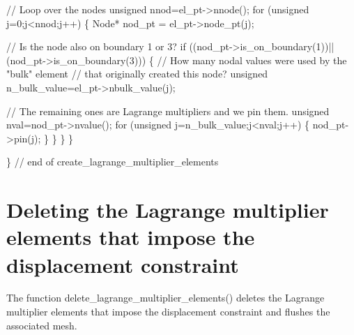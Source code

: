 \begin{DoxyCodeInclude}
   
   \textcolor{comment}{// Loop over the nodes }
   \textcolor{keywordtype}{unsigned} nnod=el\_pt->nnode();
   \textcolor{keywordflow}{for} (\textcolor{keywordtype}{unsigned} j=0;j<nnod;j++)
    \{
     Node* nod\_pt = el\_pt->node\_pt(j);
     
     \textcolor{comment}{// Is the node also on boundary 1 or 3?}
     \textcolor{keywordflow}{if} ((nod\_pt->is\_on\_boundary(1))||(nod\_pt->is\_on\_boundary(3)))
      \{
       \textcolor{comment}{// How many nodal values were used by the "bulk" element}
       \textcolor{comment}{// that originally created this node?}
       \textcolor{keywordtype}{unsigned} n\_bulk\_value=el\_pt->nbulk\_value(j);
       
       \textcolor{comment}{// The remaining ones are Lagrange multipliers and we pin them.}
       \textcolor{keywordtype}{unsigned} nval=nod\_pt->nvalue();
       \textcolor{keywordflow}{for} (\textcolor{keywordtype}{unsigned} j=n\_bulk\_value;j<nval;j++)
        \{
         nod\_pt->pin(j);
        \}
      \}
    \}
  \}
  
\} \textcolor{comment}{// end of create\_lagrange\_multiplier\_elements}

\end{DoxyCodeInclude}




 

\hypertarget{index_kill_lagr_elements}{}\section{Deleting the Lagrange multiplier elements that impose the displacement constraint}\label{index_kill_lagr_elements}
The function {\ttfamily delete\+\_\+lagrange\+\_\+multiplier\+\_\+elements()} deletes the Lagrange multiplier elements that impose the displacement constraint and flushes the associated mesh.

